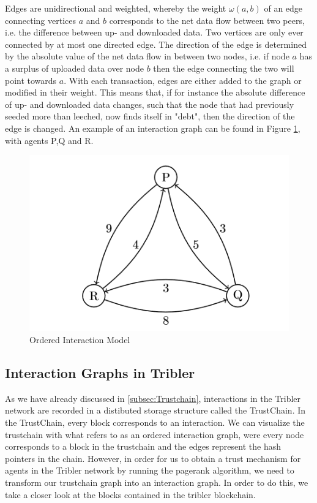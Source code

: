 \documentclass[sigconf]{acmart}
\theoremstyle{definition}
\begin{document}
\noindent Edges are unidirectional and weighted, whereby the weight $\omega(a,b)$ of an edge connecting vertices $a$ and $b$ corresponds to the net data flow between two peers, i.e. the difference between up- and downloaded data. Two vertices are only ever connected by at most one directed edge. The direction of the edge is determined by the absolute value of the net data flow in between two nodes, i.e. if node $a$ has a surplus of uploaded data over node $b$ then the edge connecting the two will point towards $a$. With each transaction, edges are either added to the graph or modified in their weight. This means that, if for instance the absolute difference of up- and downloaded data changes, such that the node that had previously seeded more than leeched, now finds itself in "debt", then the direction of the edge is changed. An example of an interaction graph can be found in Figure \ref{fig:InteractionGraph}, with agents P,Q and R.
\begin{figure}
\includegraphics[scale=1]{InteractionGraph}
\caption{Ordered Interaction Model}
\label{fig:InteractionGraph}
\end{figure}

\subsection{Interaction Graphs in Tribler}
\label{subsec:InteractionGraphsInTribler}
As we have already discussed in \ref{subsec:Trustchain}, interactions in the Tribler network are recorded in a distibuted storage structure called the TrustChain. In the TrustChain, every block corresponds to an interaction. We can visualize the trustchain with what \citep{Sybil-resistant trust mechanisms in distributed systems} refers to as an ordered interaction graph, were every node corresponds to a block in the trustchain and the edges represent the hash pointers in the chain. However, in order for us to obtain a trust mechanism for agents in the Tribler network by running the pagerank algorithm, we need to transform our trustchain graph into an interaction graph. In order to do this, we take a closer look at the blocks contained in the tribler blockchain. \vspace{1em}\\
\end{document}
